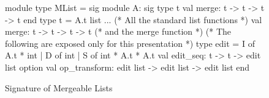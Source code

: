 \begin{figure}
\begin{ocaml}
module type MList = sig
  module A: sig
    type t
    val merge: t -> t -> t -> t
  end
  type t = A.t list
  ... (* All the standard list functions *)
  val merge: t -> t -> t -> t (* and the merge function *)
  (* The following are exposed only for this presentation *)
  type edit =
      I of A.t * int
    | D of int
    | S of int * A.t * A.t
  val edit_seq: t -> t -> edit list option
  val op_transform: edit list -> edit list -> edit list
end
\end{ocaml}
\caption{Signature of Mergeable Lists}
\label{fig:mlist}
\end{figure}
